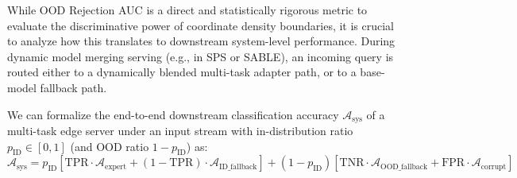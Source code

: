 While OOD Rejection AUC is a direct and statistically rigorous metric to evaluate the discriminative power of coordinate density boundaries, it is crucial to analyze how this translates to downstream system-level performance. During dynamic model merging serving (e.g., in SPS or SABLE), an incoming query is routed either to a dynamically blended multi-task adapter path, or to a base-model fallback path.

We can formalize the end-to-end downstream classification accuracy $\mathcal{A}_{\text{sys}}$ of a multi-task edge server under an input stream with in-distribution ratio $p_{\text{ID}} \in [0, 1]$ (and OOD ratio $1 - p_{\text{ID}}$) as:
\begin{equation}
\label{submission:eq:sys_accuracy}
    \mathcal{A}_{\text{sys}} = p_{\text{ID}} \left[ \text{TPR} \cdot \mathcal{A}_{\text{expert}} + (1 - \text{TPR}) \cdot \mathcal{A}_{\text{ID\_fallback}} \right] + (1 - p_{\text{ID}}) \left[ \text{TNR} \cdot \mathcal{A}_{\text{OOD\_fallback}} + \text{FPR} \cdot \mathcal{A}_{\text{corrupt}} \right]
\end{equation}
